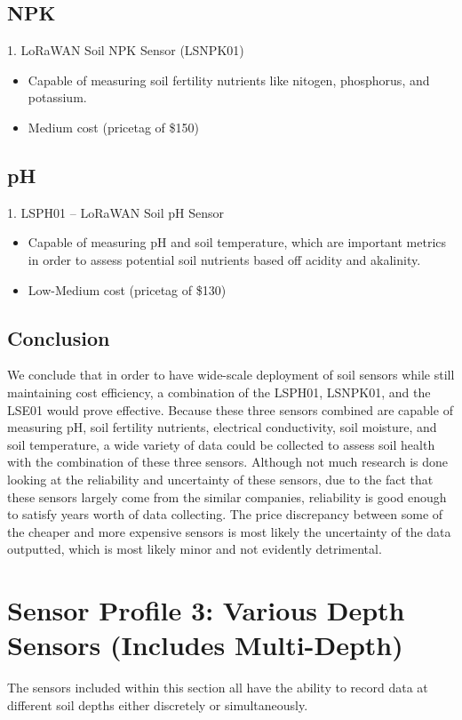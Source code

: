 \documentclass{article}
\begin{document}
\subsection{NPK}
	1. LoRaWAN Soil NPK Sensor (LSNPK01)
\begin{itemize}
\item Capable of measuring soil fertility nutrients like nitogen, phosphorus, and potassium.
\item Medium cost (pricetag of \$150)
\end{itemize}
\subsection{pH}
	1. LSPH01 -- LoRaWAN Soil pH Sensor
\begin{itemize}
\item Capable of measuring pH and soil temperature, which are important metrics in order to assess potential soil nutrients based off acidity and akalinity.
\item Low-Medium cost (pricetag of \$130)																		%
\end{itemize}


\subsection{Conclusion}
We conclude that in order to have wide-scale deployment of soil sensors while still maintaining cost efficiency, a combination of the LSPH01, LSNPK01, and the LSE01 would prove effective. Because these three sensors combined are capable of measuring pH, soil fertility nutrients, electrical conductivity, soil moisture, and soil temperature, a wide variety of data could be collected to assess soil health with the combination of these three sensors. Although not much research is done looking at the reliability and uncertainty of these sensors, due to the fact that these sensors largely come from the similar companies, reliability is good enough to satisfy years worth of data collecting. The price discrepancy between some of the cheaper and more expensive sensors is most likely the uncertainty of the data outputted, which is most likely minor and not evidently detrimental.

\section{Sensor Profile 3: Various Depth Sensors (Includes Multi-Depth)}
The sensors included within this section all have the ability to record data at different soil depths either discretely or simultaneously.
\end{document}
